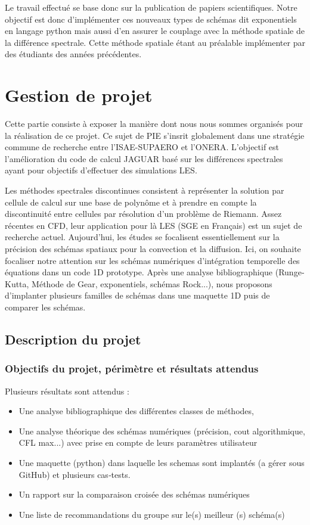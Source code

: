 \documentclass[a4paper,12pt]{report}
\theoremstyle{break}
\begin{document}
Le travail effectué se base donc sur la publication de papiers scientifiques. Notre objectif est donc d'implémenter ces nouveaux types de schémas dit \og exponentiels \fg{} en langage python mais aussi d'en assurer le couplage avec la méthode spatiale de la différence spectrale. Cette méthode spatiale étant au préalable implémenter par des étudiants des années précédentes. 

\part{Gestion de projet}

\vfill

Cette partie consiste à exposer la manière dont nous nous sommes organisés pour la réalisation de ce projet. Ce sujet de PIE s'insrit globalement dans une stratégie commune de recherche entre l'ISAE-SUPAERO et l'ONERA. L'objectif est l'amélioration du code de calcul JAGUAR basé sur les différences spectrales ayant pour objectifs d'effectuer des simulations LES.


Les méthodes spectrales discontinues consistent à représenter la solution par cellule de calcul sur une base de polynôme et à prendre en compte la discontinuité entre cellules par résolution d’un problème de Riemann. Assez récentes en CFD, leur application pour là LES (SGE en Français) est un sujet de recherche actuel. Aujourd’hui, les études se focalisent essentiellement sur la précision des schémas spatiaux pour la convection et la diffusion. Ici, on souhaite focaliser notre attention sur les schémas numériques d’intégration temporelle des équations dans un code 1D prototype. Après une analyse bibliographique (Runge‐Kutta, Méthode de Gear, exponentiels, schémas Rock...), nous proposons d’implanter plusieurs familles de schémas dans une maquette 1D puis de comparer les schémas.

\vfill

\chapter{Description du projet}

\section{Objectifs du projet, périmètre et résultats attendus}
    Plusieurs résultats sont attendus : 
\begin{itemize}[label=\textbullet,]
		\item Une analyse bibliographique des différentes classes de méthodes, 
		\item Une analyse théorique des schémas numériques (précision, cout algorithmique, CFL max...) avec prise en compte de leurs paramètres utilisateur 
		\item Une maquette (python) dans laquelle les schemas sont implantés (a gérer sous 
        GitHub) et plusieurs cas‐tests. 
		\item Un rapport sur la comparaison croisée des schémas numériques
		\item Une liste de recommandations du groupe sur le(s) meilleur (s) schéma(s)
	\end{itemize}
	
\end{document}
